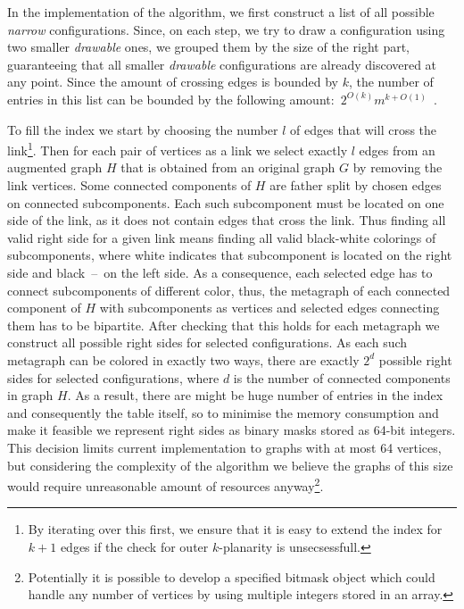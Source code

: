 In the implementation of the algorithm, we first construct a list of all possible \emph{narrow} configurations. Since, on each step, we try to draw a configuration using two smaller \emph{drawable} ones, we grouped them by the size of the right part, guaranteeing that all smaller \emph{drawable} configurations are already discovered at any point. Since the amount of crossing edges is bounded by \(k\), the number of entries in this list can be bounded by the following amount:~\(2^{O(k)}m^{k+O(1)}\)~\cite[Lemma 15]{okp}.

To fill the index we start by choosing the number \(l\) of edges that will cross the link\footnote{By iterating over this first, we ensure that it is easy to extend the index for \(k+1\) edges if the check for outer \(k\)-planarity is unsecsessfull.}. Then for each pair of vertices as a link we select exactly \(l\) edges from an augmented graph \(H\) that is obtained from an original graph \(G\) by removing the link vertices. Some connected components of \(H\) are father split by chosen edges on connected subcomponents. Each such subcomponent must be located on one side of the link, as it does not contain edges that cross the link. Thus finding all valid right side for a given link means finding all valid black-white colorings of subcomponents, where white indicates that subcomponent is located on the right side and black~--~on the left side. As a consequence, each selected edge has to connect subcomponents of different color, thus, the metagraph of each connected component of \(H\) with subcomponents as vertices and selected edges connecting them has to be bipartite. After checking that this holds for each metagraph we construct all possible right sides for selected configurations. As each such metagraph can be colored in exactly two ways, there are exactly \(2^d\) possible right sides for selected configurations, where \(d\) is the number of connected components in graph \(H\). As a result, there are might be huge number of entries in the index and consequently the table itself, so to minimise the memory consumption and make it feasible we represent right sides as binary masks stored as 64-bit integers. This decision limits current implementation to graphs with at most 64 vertices, but considering the complexity of the algorithm we believe the graphs of this size would require unreasonable amount of resources anyway\footnote{Potentially it is possible to develop a specified bitmask object which could handle any number of vertices by using multiple integers stored in an array.}.

